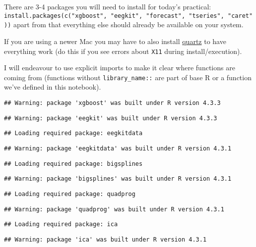\documentclass[
]{article}
\author{}
\date{\vspace{-2.5em}}
\begin{document}
There are 3-4 packages you will need to install for today's practical:
\texttt{install.packages(c("xgboost",\ "eegkit",\ "forecast",\ "tseries",\ "caret"))}
apart from that everything else should already be available on your
system.

If you are using a newer Mac you may have to also install
\href{https://www.xquartz.org/}{quartz} to have everything work (do this
if you see errors about \texttt{X11} during install/execution).

I will endeavour to use explicit imports to make it clear where
functions are coming from (functions without \texttt{library\_name::}
are part of base R or a function we've defined in this notebook).

\begin{verbatim}
## Warning: package 'xgboost' was built under R version 4.3.3
\end{verbatim}

\begin{verbatim}
## Warning: package 'eegkit' was built under R version 4.3.3
\end{verbatim}

\begin{verbatim}
## Loading required package: eegkitdata
\end{verbatim}

\begin{verbatim}
## Warning: package 'eegkitdata' was built under R version 4.3.1
\end{verbatim}

\begin{verbatim}
## Loading required package: bigsplines
\end{verbatim}

\begin{verbatim}
## Warning: package 'bigsplines' was built under R version 4.3.1
\end{verbatim}

\begin{verbatim}
## Loading required package: quadprog
\end{verbatim}

\begin{verbatim}
## Warning: package 'quadprog' was built under R version 4.3.1
\end{verbatim}

\begin{verbatim}
## Loading required package: ica
\end{verbatim}

\begin{verbatim}
## Warning: package 'ica' was built under R version 4.3.1
\end{verbatim}
\end{document}
